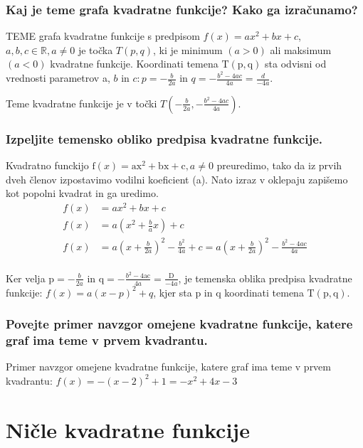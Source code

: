 \documentclass{article}
\begin{document}
\subsubsection*{Kaj je teme grafa kvadratne funkcije? Kako ga izračunamo?}

TEME grafa kvadratne funkcije s predpisom $f(x)=a x^{2}+b x+c$, $a, b, c \in \mathbb{R}, a \neq 0$ je točka $T(p, q)$, ki je minimum $(a>0)$ ali maksimum $(a<0)$ kvadratne funkcije. Koordinati temena $\mathrm{T}(\mathrm{p}, \mathrm{q})$ sta odvisni od vrednosti parametrov a, $b$ in $c: p=-\frac{b}{2 a}$ in $q=-\frac{b^{2}-4 a c}{4 a}=\frac{d}{-4 a}$.

Teme kvadratne funkcije je v točki $T\left(-\frac{b}{2 a},-\frac{b^{2}-4 a c}{4 a}\right)$.

\subsubsection*{Izpeljite temensko obliko predpisa kvadratne funkcije.}

Kvadratno funckijo $\mathrm{f}(x)=\mathrm{ax}^{2}+\mathrm{bx}+\mathrm{c}, a \neq 0$ preuredimo, tako da iz prvih dveh členov izpostavimo vodilni koeficient (a). Nato izraz v oklepaju zapišemo kot popolni kvadrat in ga uredimo.
\begin{align*}
f(x)&=a x^{2}+b x+c \\
f(x)&=a\left(x^{2}+\frac{b}{a} x\right)+c \\
f(x)&=a\left(x+\frac{b}{2 a}\right)^{2}-\frac{b^{2}}{4 a}+c=a\left(x+\frac{b}{2 a}\right)^{2}-\frac{b^{2}-4 a c}{4 a} \\
\end{align*}


Ker velja $\mathrm{p}=-\frac{b}{2 a}$ in $\mathrm{q}=-\frac{b^{2}-4 \mathrm{ac}}{4 a}=\frac{\mathrm{D}}{-4 a}$, je temenska oblika predpisa kvadratne funkcije: $f(x)=a(x-p)^{2}+q$, kjer sta $\mathrm{p}$ in q koordinati temena $\mathrm{T}(\mathrm{p}, \mathrm{q})$.

\subsubsection*{Povejte primer navzgor omejene kvadratne funkcije, katere graf ima teme v prvem kvadrantu.}

Primer navzgor omejene kvadratne funkcije, katere graf ima teme v prvem kvadrantu: $f(x)=-(x-2)^{2}+1=-x^{2}+4 x-3$

\section{Ničle kvadratne funkcije}
\end{document}
